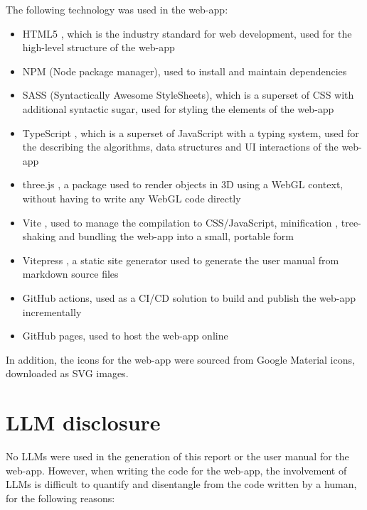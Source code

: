 \documentclass[letterpaper,11pt]{article}
\begin{document}
The following technology was used in the web-app:

\begin{itemize}
	\item HTML5 \cite{HTML5}, which is the industry standard for web development, used for the high-level structure of the web-app
	\item NPM \cite{npm} (Node package manager), used to install and maintain dependencies
	\item SASS \cite{sass} (Syntactically Awesome StyleSheets), which is a superset of CSS with additional syntactic sugar, used for styling the elements of the web-app
	\item TypeScript \cite{typescript}, which is a superset of JavaScript with a typing system, used for the describing the algorithms, data structures and UI interactions of the web-app
	\item three.js \cite{3js}, a package used to render objects in 3D using a WebGL context, without having to write any WebGL code directly
	\item Vite \cite{vite}, used to manage the compilation to CSS/JavaScript, minification \cite{minification}, tree-shaking \cite{tree} and bundling the web-app into a small, portable form
	\item Vitepress \cite{vitepress}, a static site generator \cite{ssg} used to generate the user manual from markdown \cite{markdown} source files
	\item GitHub actions, used as a CI/CD solution to build and publish the web-app incrementally
	\item GitHub pages, used to host the web-app online
\end{itemize}

In addition, the icons for the web-app were sourced from Google Material \cite{google-material} icons, downloaded as SVG images.


\section*{LLM disclosure}

No LLMs were used in the generation of this report or the user manual for the web-app. However, when writing the code for the web-app, the involvement of LLMs is difficult to quantify and disentangle from the code written by a human, for the following reasons:
\end{document}
